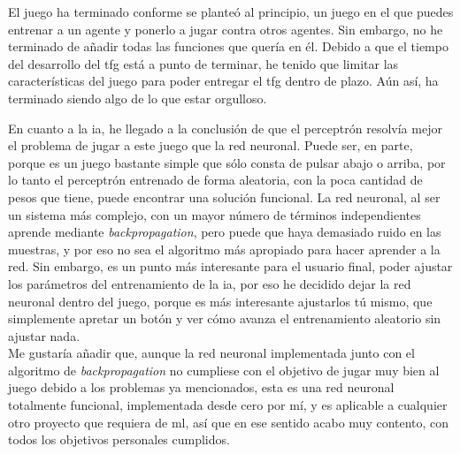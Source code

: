 El juego ha terminado conforme se planteó al principio, un juego en el que puedes entrenar a un agente y ponerlo a jugar contra otros agentes. Sin embargo, no he terminado de añadir todas las funciones que quería en él. Debido a que el tiempo del desarrollo del \gls{tfg} está a punto de terminar, he tenido que limitar las características del juego para poder entregar el \gls{tfg} dentro de plazo. Aún así, ha terminado siendo algo de lo que estar orgulloso.

En cuanto a la \gls{ia}, he llegado a la conclusión de que el perceptrón resolvía mejor el problema de jugar a este juego que la red neuronal. Puede ser, en parte, porque es un juego bastante simple que sólo consta de pulsar abajo o arriba, por lo tanto el perceptrón entrenado de forma aleatoria, con la poca cantidad de pesos que tiene, puede encontrar una solución funcional. La red neuronal, al ser un sistema más complejo, con un mayor número de términos independientes aprende mediante \textit{backpropagation}, pero puede que haya demasiado ruido en las muestras, y por eso no sea el algoritmo más apropiado para hacer aprender a la red. Sin embargo, es un punto más interesante para el usuario final, poder ajustar los parámetros del entrenamiento de la \gls{ia}, por eso he decidido dejar la red neuronal dentro del juego, porque es más interesante ajustarlos tú mismo, que simplemente apretar un botón y ver cómo avanza el entrenamiento aleatorio sin ajustar nada.
\\
Me gustaría añadir que, aunque la red neuronal implementada junto con el algoritmo de \textit{backpropagation} no cumpliese con el objetivo de jugar muy bien al juego debido a los problemas ya mencionados, esta es una red neuronal totalmente funcional, implementada desde cero por mí, y es aplicable a cualquier otro proyecto que requiera de \gls{ml}, así que en ese sentido acabo muy contento, con todos los objetivos personales cumplidos.